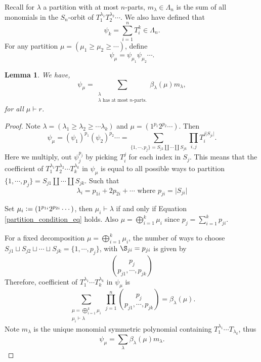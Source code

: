 \documentclass[10pt]{article}
\newtheorem{lemma}{Lemma}[section]
\numberwithin{equation}{theorem}
\newcommand{\defeq}{\vcentcolon=}
\begin{document}
Recall for $\lambda$ a partition with at most $n$-parts, $m_\lambda\in\Lambda_n$ is the sum of all monomials in the $S_n$-orbit of $T_1^{\lambda_1}T_2^{\lambda_2}\cdots$. 
We also have defined that 
\begin{equation*}
  \psi_k = \sum_{i=1}^n T_i^k\in\Lambda_n.
\end{equation*}
For any partition $\mu=(\mu_1\geq\mu_2\geq\cdots)$, define 
\begin{equation*}
  \psi_{\mu} = \psi_{\mu_1}\psi_{\mu_2}\cdots.
\end{equation*}
\begin{lemma}
  We have,
  \begin{equation*}
    \psi_\mu = \sum_{\substack{\lambda\\\text{$\lambda$ has at most $n$-parts.}}}\beta_\lambda(\mu) m_\lambda,
  \end{equation*}
  for all $\mu\vdash r$.
\end{lemma}
\begin{proof}
  Note $\lambda = (\lambda_1\geq \lambda_2\geq\cdots\lambda_k)$ and $\mu=(1^{p_1}2^{p_2}\cdots)$. Then 
  \begin{equation*}
    \psi_\mu = (\psi_1)^{p_1}(\psi_2)^{p_2}\cdots = \sum_{\{1,\cdots,p_j\}=S_{j1}\coprod\cdots\coprod S_{jk}}\prod_{i,j}T_i^{j\vert S_{ji}\vert}.
  \end{equation*}
  Here we multiply, out $\psi_j^{p_j}$ by picking $T_i^j$ for each index in $S_j$. 
This means that the coefficient of $T_1^{\lambda_1}T_2^{\lambda_2}\cdots T_{k}^{\lambda_k}$ in $\psi_\mu$ is equal to all possible ways to partition $\{1,\cdots,p_j\} = S_{j1}\coprod\cdots \coprod S_{jk}$.
Such that 
\begin{equation}
  \lambda_i = p_{1i}+2p_{2i}+\cdots \text{ where } p_{ji} = \vert S_{ji}\vert \label{partition_condition_eq}
\end{equation} 
\par Set $\mu_i \defeq (1^{p_{1i}}2^{p_{2i}}\cdots)$, then $\mu_i\vdash \lambda$ if and only if Equation \eqref{partition_condition_eq} holds.
 Also $\mu=\bigoplus_{i=1}^k\mu_i$ since $p_j = \sum_{i=1}^kp_{ji}$.
\par For a fixed decomposition $\mu=\bigoplus_{i=1}^k \mu_i$, the number of ways to choose $S_{j1}\sqcup S_{j2}\sqcup\cdots\sqcup S_{jk} = \{1,\cdots,p_j\}$, with $\S_{ji} = p_{ji}$ is given by 
\begin{equation*}
  {p_j \choose p_{j1},\cdots,p_{jk}}
\end{equation*}
Therefore, coefficient of $T_1^{\lambda_1}\cdots T_k^{\lambda_k}$ in $\psi_\mu$ is 
\begin{equation*}
  \sum_{\substack{\mu = \bigoplus_{i=1}^k\mu_i\\ \mu_i\vdash \lambda}}\prod_{j=1}^n{p_j \choose p_{j1},\cdots,p_{jk}} = \beta_\lambda(\mu).
\end{equation*}
Note $m_\lambda$ is the unique monomial symmetric polynomial containing $T_1^{\lambda_1}\cdots T_{\lambda_k}$, thus 
\begin{equation*}
  \psi_\mu = \sum_{\lambda}\beta_{\lambda}(\mu)m_{\lambda}.
\end{equation*}
\end{proof}
\end{document}
